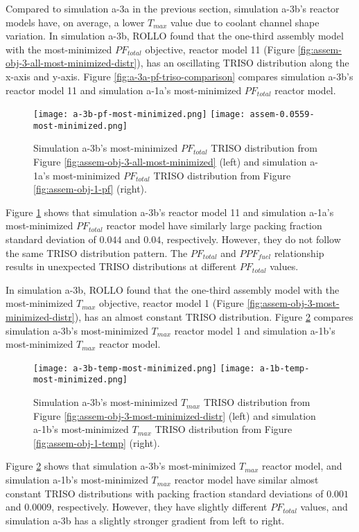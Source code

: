 Compared to simulation a-3a in the previous section, simulation a-3b's reactor models 
have, on average, a lower $T_{max}$ value due to coolant channel shape variation. 
In simulation a-3b, \gls{ROLLO} found that the one-third assembly model with the 
most-minimized $PF_{total}$ objective, reactor model 11 (Figure 
\ref{fig:assem-obj-3-all-most-minimized-distr}), has an oscillating TRISO distribution 
along the x-axis and y-axis.
Figure \ref{fig:a-3a-pf-triso-comparison} compares simulation a-3b's reactor model 11 
and simulation a-1a's most-minimized $PF_{total}$ reactor model. 
\begin{figure}[htbp!]
    \centering
    \texttt{[image: a-3b-pf-most-minimized.png]} 
    \texttt{[image: assem-0.0559-most-minimized.png]} 
    \caption{Simulation a-3b's most-minimized $PF_{total}$ TRISO distribution 
    from Figure \ref{fig:assem-obj-3-all-most-minimized} (left) and simulation a-1a's 
    most-minimized $PF_{total}$ TRISO distribution from Figure 
    \ref{fig:assem-obj-1-pf} (right).}
    \label{fig:a-3b-pf-triso-comparison}
\end{figure}
Figure \ref{fig:a-3b-pf-triso-comparison} shows that simulation a-3b's reactor model 11 
and simulation a-1a's most-minimized $PF_{total}$ reactor model have similarly large 
packing fraction standard deviation of $0.044$ and $0.04$, respectively. 
However, they do not follow the same TRISO distribution pattern. 
The $PF_{total}$ and $PPF_{fuel}$ relationship results in unexpected 
TRISO distributions at different $PF_{total}$ values.  

In simulation a-3b, \gls{ROLLO} found that the one-third assembly model with the 
most-minimized $T_{max}$ objective, reactor model 1 (Figure 
\ref{fig:assem-obj-3-most-minimized-distr}), has an almost constant TRISO distribution.
Figure \ref{fig:a-3b-temp-triso-comparison} compares simulation a-3b's most-minimized 
$T_{max}$ reactor model 1 and simulation a-1b's most-minimized $T_{max}$ reactor model. 
\begin{figure}[htbp!]
    \centering
    \texttt{[image: a-3b-temp-most-minimized.png]} 
    \texttt{[image: a-1b-temp-most-minimized.png]} 
    \caption{Simulation a-3b's most-minimized $T_{max}$ TRISO distribution 
    from Figure \ref{fig:assem-obj-3-most-minimized-distr} (left) and simulation a-1b's 
    most-minimized $T_{max}$ TRISO distribution from Figure 
    \ref{fig:assem-obj-1-temp} (right).}
    \label{fig:a-3b-temp-triso-comparison}
\end{figure}
Figure \ref{fig:a-3b-temp-triso-comparison} shows that simulation a-3b's most-minimized 
$T_{max}$ reactor model, and simulation a-1b's most-minimized $T_{max}$ reactor model 
have similar almost constant TRISO distributions with packing fraction standard 
deviations of $0.001$ and $0.0009$, respectively.
However, they have slightly different $PF_{total}$ values, and simulation a-3b has a 
slightly stronger gradient from left to right. 

